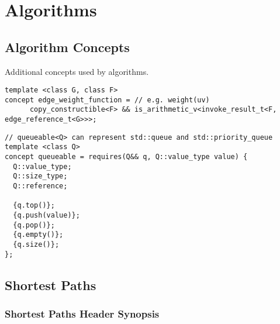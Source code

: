 \section{Algorithms}

\subsection{Algorithm Concepts}
Additional concepts used by algorithms.

\begin{lstlisting}
template <class G, class F>
concept edge_weight_function = // e.g. weight(uv)
      copy_constructible<F> && is_arithmetic_v<invoke_result_t<F, edge_reference_t<G>>>;
\end{lstlisting}

\begin{lstlisting}
// queueable<Q> can represent std::queue and std::priority_queue
template <class Q>
concept queueable = requires(Q&& q, Q::value_type value) {
  Q::value_type;
  Q::size_type;
  Q::reference;

  {q.top()};
  {q.push(value)};
  {q.pop()};
  {q.empty()};
  {q.size()};
};
\end{lstlisting}



\subsection{Shortest Paths}



\subsubsection{Shortest Paths Header Synopsis}

